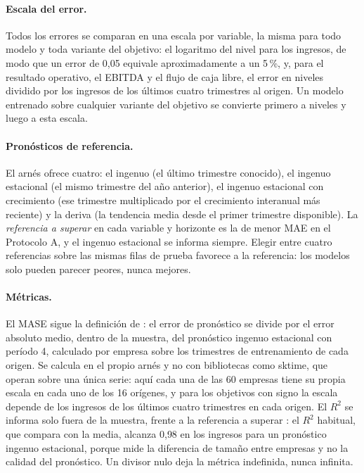 \documentclass[12pt,letterpaper,oneside]{report}
\renewcommand{\_}{\UnderscoreOriginal\allowbreak}
\begin{document}
\paragraph{Escala del error.} Todos los errores se comparan en una escala por variable, la misma para todo modelo y toda variante del objetivo: el logaritmo del nivel para los ingresos, de modo que un error de 0{,}05 equivale aproximadamente a un 5\,\%, y, para el resultado operativo, el EBITDA y el flujo de caja libre, el error en niveles dividido por los ingresos de los últimos cuatro trimestres al origen. Un modelo entrenado sobre cualquier variante del objetivo se convierte primero a niveles y luego a esta escala.

\paragraph{Pronósticos de referencia.} El arnés ofrece cuatro: el ingenuo (el último trimestre conocido), el ingenuo estacional (el mismo trimestre del año anterior), el ingenuo estacional con crecimiento (ese trimestre multiplicado por el crecimiento interanual más reciente) y la deriva (la tendencia media desde el primer trimestre disponible). La \emph{referencia a superar} en cada variable y horizonte es la de menor MAE en el Protocolo A, y el ingenuo estacional se informa siempre. Elegir entre cuatro referencias sobre las mismas filas de prueba favorece a la referencia: los modelos solo pueden parecer peores, nunca mejores.

\paragraph{Métricas.} El MASE sigue la definición de \textcite{hyndman2006another}: el error de pronóstico se divide por el error absoluto medio, dentro de la muestra, del pronóstico ingenuo estacional con período 4, calculado por empresa sobre los trimestres de entrenamiento de cada origen. Se calcula en el propio arnés y no con bibliotecas como sktime, que operan sobre una única serie: aquí cada una de las 60 empresas tiene su propia escala en cada uno de los 16 orígenes, y para los objetivos con signo la escala depende de los ingresos de los últimos cuatro trimestres en cada origen. El $R^2$ se informa solo fuera de la muestra, frente a la referencia a superar \parencite{campbell2008predicting}: el $R^2$ habitual, que compara con la media, alcanza 0{,}98 en los ingresos para un pronóstico ingenuo estacional, porque mide la diferencia de tamaño entre empresas y no la calidad del pronóstico. Un divisor nulo deja la métrica indefinida, nunca infinita.
\end{document}
